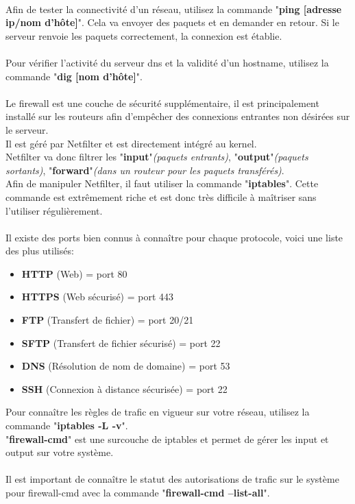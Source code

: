 \documentclass[12pt, a4paper]{article}
\begin{document}
\\
Afin de tester la connectivité d'un réseau, utilisez la commande "\textbf{ping [adresse ip/nom d'hôte]}". Cela va envoyer des paquets et en demander en retour. Si le serveur renvoie les paquets correctement, la connexion est établie.\\
\\
Pour vérifier l'activité du serveur dns et la validité d'un hostname, utilisez la commande "\textbf{dig [nom d'hôte]}".\\
\\
Le firewall est une couche de sécurité supplémentaire, il est principalement installé sur les routeurs afin d'empêcher des connexions entrantes non désirées sur le serveur.\\
Il est géré par Netfilter et est directement intégré au kernel.\\
Netfilter va donc filtrer les "\textbf{input}"\emph{(paquets entrants)}, "\textbf{output}"\emph{(paquets sortants)}, "\textbf{forward}"\emph{(dans un routeur pour les paquets transférés)}.\\
Afin de manipuler Netfilter, il faut utiliser la commande "\textbf{iptables}". Cette commande est extrêmement riche et est donc très difficile à maîtriser sans l'utiliser régulièrement.\\
\\
Il existe des ports bien connus à connaître pour chaque protocole, voici une liste des plus utilisés:
\begin{itemize}
\setlength\itemsep{-0.4em}
\item \textbf{HTTP} (Web) = port 80
\item \textbf{HTTPS} (Web sécurisé) = port 443
\item \textbf{FTP} (Transfert de fichier) = port 20/21
\item \textbf{SFTP} (Transfert de fichier sécurisé) = port 22
\item \textbf{DNS} (Résolution de nom de domaine) = port 53
\item \textbf{SSH} (Connexion à distance sécurisée) = port 22
\end{itemize}
\vspace*{1cm}
Pour connaître les règles de trafic en vigueur sur votre réseau, utilisez la commande "\textbf{iptables -L -v}".\\
"\textbf{firewall-cmd}" est une surcouche de iptables et permet de gérer les input et output sur votre système.\\
\\
Il est important de connaître le statut des autorisations de trafic sur le système pour firewall-cmd avec la commande "\textbf{firewall-cmd --list-all}".\\
\end{document}
